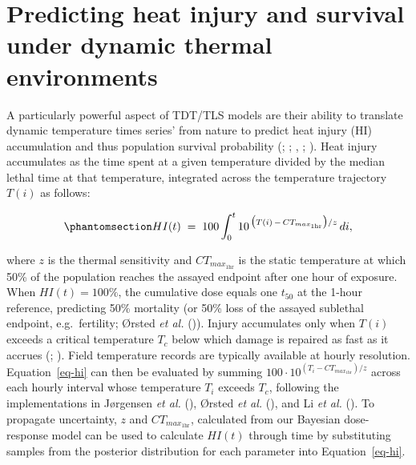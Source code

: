 \documentclass[
  11pt,
]{article}
\begin{document}
\section{Predicting heat injury and survival under dynamic thermal
environments}\label{predicting-heat-injury-and-survival-under-dynamic-thermal-environments}

A particularly powerful aspect of TDT/TLS models are their ability to
translate dynamic temperature times series' from nature to predict heat
injury (HI) accumulation and thus population survival probability
(;
;
,
;
). Heat injury accumulates as the time spent at a given temperature
divided by the median lethal time at that temperature, integrated across
the temperature trajectory \(T(i)\) as follows:

\begin{equation}\phantomsection\label{eq-hi}{
HI(t) \;=\; 100 \int_0^t 10^{\,\big(T(i)\,-\,CT_{max_{1\text{hr}}}\big)/z} \,di,
}\end{equation}

where \(z\) is the thermal sensitivity and \(CT_{max_{1\text{hr}}}\) is
the static temperature at which 50\% of the population reaches the
assayed endpoint after one hour of exposure. When \(HI(t) = 100\%\), the
cumulative dose equals one \(t_{50}\) at the 1-hour reference,
predicting 50\% mortality (or 50\% loss of the assayed sublethal
endpoint, e.g.~fertility; Ørsted \emph{et al.}
()). Injury accumulates only
when \(T(i)\) exceeds a critical temperature \(T_c\) below which damage
is repaired as fast as it accrues
(;
). Field
temperature records are typically available at hourly resolution.
Equation~\ref{eq-hi} can then be evaluated by summing
\(100 \cdot 10^{(T_i - CT_{max_{1\text{hr}}})/z}\) across each hourly
interval whose temperature \(T_i\) exceeds \(T_c\), following the
implementations in Jørgensen \emph{et al.}
(), Ørsted \emph{et al.}
(), and Li \emph{et al.}
(). To propagate uncertainty, \(z\) and
\(CT_{max_{1\text{hr}}}\), calculated from our Bayesian dose-response
model can be used to calculate \(HI(t)\) through time by substituting
samples from the posterior distribution for each parameter into
Equation~\ref{eq-hi}.
\end{document}
